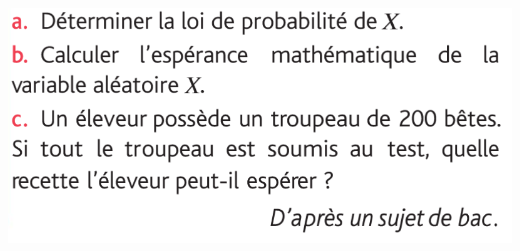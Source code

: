 \documentclass{article}
\begin{document}
\begin{center}
\includegraphics[width=\textwidth]{Exercice_Avance_4.png}
\end{center}
\end{document}

